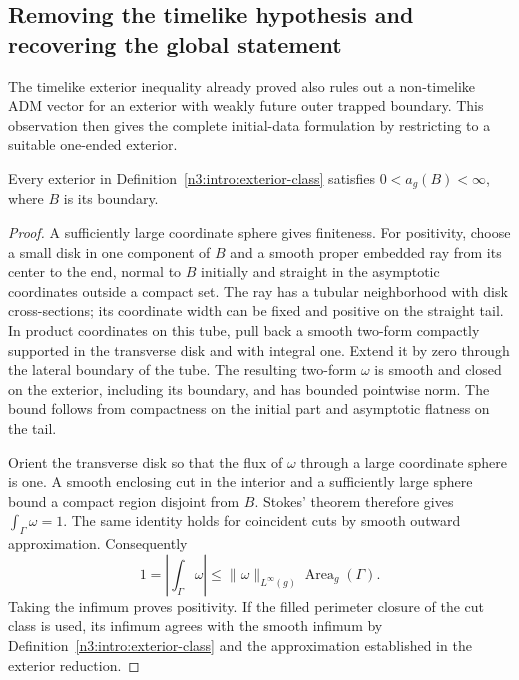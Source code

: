 \subsection{Removing the timelike hypothesis and recovering the global statement}
\label{bridge:bridge:section}

The timelike exterior inequality already proved also rules out a
non-timelike ADM vector for an exterior with weakly future outer trapped
boundary.  This observation then gives the complete initial-data
formulation by restricting to a suitable one-ended exterior.

\begin{lemma}
\label{bridge:bridge:positive-area}
Every exterior in Definition~\ref{n3:intro:exterior-class} satisfies
$0<a_g(B)<\infty$, where $B$ is its boundary.
\end{lemma}

\begin{proof}
A sufficiently large coordinate sphere gives finiteness.  For positivity,
choose a small disk in one component of $B$ and a smooth proper embedded
ray from its center to the end, normal to $B$ initially and straight in
the asymptotic coordinates outside a compact set.  The ray has a tubular
neighborhood with disk cross-sections; its coordinate width can be fixed
and positive on the straight tail.  In product coordinates on this tube,
pull back a smooth two-form compactly supported in the transverse disk
and with integral one.  Extend it by zero through the lateral boundary
of the tube.  The resulting two-form $\omega$ is smooth and closed on
the exterior, including its boundary, and has bounded pointwise norm.
The bound follows from compactness on the initial part and asymptotic
flatness on the tail.

Orient the transverse disk so that the flux of $\omega$ through a large
coordinate sphere is one.  A smooth enclosing cut in the interior and a
sufficiently large sphere bound a compact region disjoint from $B$.
Stokes' theorem therefore gives $\int_\Gamma\omega=1$.  The same identity
holds for coincident cuts by smooth outward approximation.  Consequently
\[
 1=\left|\int_\Gamma\omega\right|
 \le \|\omega\|_{L^\infty(g)}\operatorname{Area}_g(\Gamma).
\]
Taking the infimum proves positivity.  If the filled perimeter closure
of the cut class is used, its infimum agrees with the smooth infimum by
Definition~\ref{n3:intro:exterior-class} and the approximation established
in the exterior reduction.
\end{proof}

